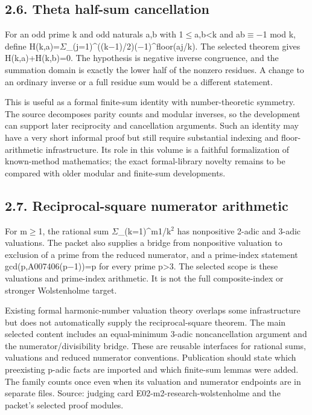 \documentclass[11pt,a4paper]{article}
\begin{document}
\subsection{2.6. Theta half-sum cancellation}
For an odd prime k and odd naturals a,b with 1\ensuremath{\leq}a,b<k and ab\ensuremath{\equiv}\ensuremath{-}1 mod k, define H(k,a)=\ensuremath{\Sigma}\_(j=1)\textasciicircum{}((k\ensuremath{-}1)/2)(\ensuremath{-}1)\textasciicircum{}floor(aj/k). The selected theorem gives H(k,a)+H(k,b)=0. The hypothesis is negative inverse congruence, and the summation domain is exactly the lower half of the nonzero residues. A change to an ordinary inverse or a full residue sum would be a different statement.

This is useful as a formal finite-sum identity with number-theoretic symmetry. The source decomposes parity counts and modular inverses, so the development can support later reciprocity and cancellation arguments. Such an identity may have a very short informal proof but still require substantial indexing and floor-arithmetic infrastructure. Its role in this volume is a faithful formalization of known-method mathematics; the exact formal-library novelty remains to be compared with older modular and finite-sum developments.

\subsection{2.7. Reciprocal-square numerator arithmetic}
For m\ensuremath{\geq}1, the rational sum \ensuremath{\Sigma}\_(k=1)\textasciicircum{}m1/k\ensuremath{^2} has nonpositive 2-adic and 3-adic valuations. The packet also supplies a bridge from nonpositive valuation to exclusion of a prime from the reduced numerator, and a prime-index statement gcd(p,A007406(p\ensuremath{-}1))=p for every prime p>3. The selected scope is these valuations and prime-index arithmetic. It is not the full composite-index or stronger Wolstenholme target.

Existing formal harmonic-number valuation theory overlaps some infrastructure but does not automatically supply the reciprocal-square theorem. The main selected content includes an equal-minimum 3-adic noncancellation argument and the numerator/divisibility bridge. These are reusable interfaces for rational sums, valuations and reduced numerator conventions. Publication should state which preexisting p-adic facts are imported and which finite-sum lemmas were added. The family counts once even when its valuation and numerator endpoints are in separate files. Source: judging card E02-m2-research-wolstenholme and the packet's selected proof modules.
\end{document}
